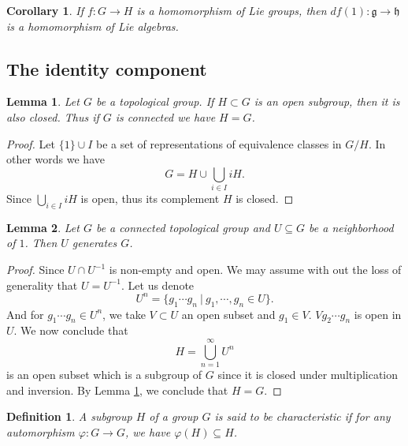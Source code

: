 \documentclass{article}
\newtheorem{definition}{Definition}[section]
\newtheorem{lemma}{Lemma}[section]
\newtheorem{corollary}{Corollary}[section]
\numberwithin{equation}{section}
\begin{document}
\begin{corollary}
If $f:G\to H$ is a homomorphism of Lie groups, then $df(1):\mathfrak{g}\to\mathfrak{h}$ is a homomorphism of Lie algebras.
\end{corollary}

\subsection{The identity component}

\begin{lemma}
Let $G$ be a topological group. If $H\subset G$ is an open subgroup, then it is also closed. Thus if $G$ is connected we have $H=G$.
\label{op_subgroup}
\end{lemma}
\begin{proof}
Let $\{1\}\cup I$ be a set of representations of equivalence classes in $G/H$. In other words we have
\begin{equation*}
G = H\cup\bigcup_{i\in I}iH. 
\end{equation*}
Since $\bigcup_{i\in I}iH$ is open, thus its complement $H$ is closed.
\end{proof}

\begin{lemma}
Let $G$ be a connected topological group and $U\subseteq G$ be a neighborhood of $1$. Then $U$ generates $G$.
\label{gen_con_top}
\end{lemma}

\begin{proof}
Since $U\cap U^{-1}$ is non-empty and open. We may assume with out the loss of generality that $U=U^{-1}$. Let us denote 
\begin{equation*}
U^n = \{g_1\cdots g_n\:|\: g_1,\cdots,g_n\in U\}.
\end{equation*}
And for $g_1\cdots g_n\in U^n$, we take $V\subset U$ an open subset and $g_1\in V$. %
$Vg_2\cdots g_n$ is open in $U$. We now conclude that
\begin{equation*}
H=\bigcup_{n=1}^\infty U^n
\end{equation*}
is an open subset which is a subgroup of $G$ since it is closed under multiplication and inversion. By Lemma \ref{op_subgroup}, we conclude that $H=G$.
\end{proof}

\begin{definition}
A subgroup $H$ of a group $G$ is said to be characteristic if for any automorphism $\varphi:G\to G$, we have $\varphi(H)\subseteq H$. 
\end{definition}
\end{document}
